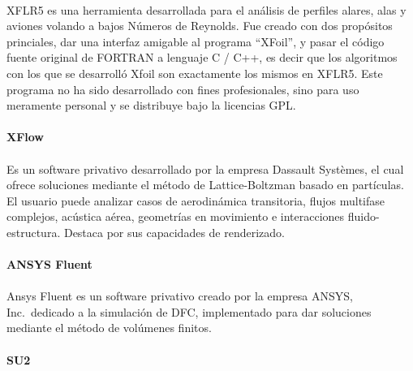 \documentclass[letterpaper, openright, 12pt]{book}
\begin{document}
            \paragraph*{}
                XFLR5 es una herramienta desarrollada para el análisis de
                perfiles alares, alas y aviones volando a bajos Números de
                Reynolds. Fue creado con dos propósitos princiales, dar una
                interfaz amigable al programa ``XFoil'', y pasar el código
                fuente original de FORTRAN a lenguaje C / C++, es decir que los
                algoritmos con los que se desarrolló Xfoil son exactamente los
                mismos en XFLR5.\cite{xflr5} Este programa no ha sido
                desarrollado con fines profesionales, sino para uso meramente
                personal y se distribuye bajo la licencias GPL.

            \paragraph*{XFlow}
            \paragraph*{}
            Es un software privativo desarrollado por la empresa
                    Dassault Systèmes, el cual ofrece soluciones mediante el
                    método de Lattice-Boltzman basado en partículas. El usuario
                    puede analizar casos de aerodinámica transitoria, flujos
                    multifase complejos, acústica aérea, geometrías en
                    movimiento e interacciones fluido-estructura. Destaca por
                    sus capacidades de renderizado.\cite{xflow}

            \paragraph*{ANSYS Fluent}
            \paragraph*{}
            Ansys Fluent es un software privativo creado por la empresa
                ANSYS, Inc.\ dedicado a la simulación de DFC, implementado
                para dar soluciones mediante el método de volúmenes finitos.

            \paragraph*{SU2}
\end{document}
